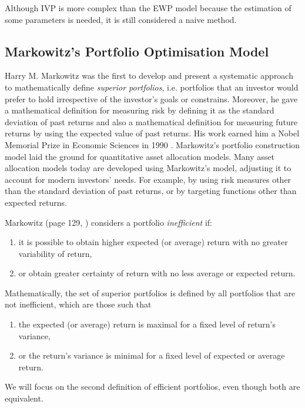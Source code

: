     Although IVP is more complex than the EWP model because the estimation of some parameters is needed, it is still considered a naive method.

\subsection{Markowitz's Portfolio Optimisation Model}
    Harry M. Markowitz was the first to develop and present a systematic approach to mathematically define \textit{superior portfolios}, i.e. portfolios that an investor would prefer to hold irrespective of the investor's goals or constrains. Moreover, he gave a mathematical definition for measuring risk by defining it as the standard deviation of past returns and also a mathematical definition for measuring future returns by using the expected value of past returns. His work earned him a Nobel Memorial Prize in Economic Sciences in 1990 \cite{markowitznobelprize}. Markowitz's portfolio construction model laid the ground for quantitative asset allocation models. Many asset allocation models today are developed using Markowitz's model, adjusting it to account for modern investors' needs. For example, by using risk measures other than the standard deviation of past returns, or by targeting functions other than expected returns.
    
    Markowitz (page 129, \cite{markowitzorg}) considers a portfolio \textit{inefficient} if:
    \begin{enumerate}
        \item it is possible to obtain higher expected (or average) return with no greater variability of return,
        
        \item or obtain greater certainty of return with no less average or expected return.
    \end{enumerate}
    
    Mathematically, the set of superior portfolios is defined by all portfolios that are not inefficient, which are those such that
    \begin{enumerate}
        \item the expected (or average) return is maximal for a fixed level of return's variance,
        \item or the return's variance is minimal for a fixed level of expected or average return.
    \end{enumerate}
    
    We will focus on the second definition of efficient portfolios, even though both are equivalent.
    
